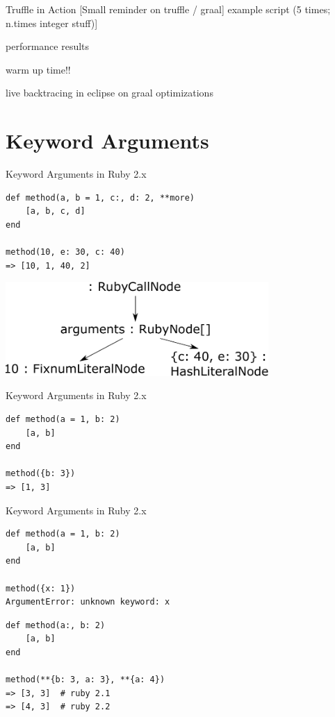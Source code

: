 \documentclass[xcolor=dvipsname,handout]{beamer} %
\begin{document}
\begin{frame}{Truffle in Action}
[Small reminder on truffle / graal]
example script (5 times; n.times integer stuff)]

performance results

warm up time!!

live backtracing in eclipse on graal optimizations
\end{frame}

\section{Keyword Arguments}

\begin{frame}[fragile]{Keyword Arguments in Ruby 2.x}
\begin{lstlisting}
def method(a, b = 1, c:, d: 2, **more)
    [a, b, c, d]
end

method(10, e: 30, c: 40)
=> [10, 1, 40, 2]
\end{lstlisting}

\begin{table}
    \centering
    \includegraphics[width=0.75\textwidth]{kwarg_1.pdf}
\end{table}
\end{frame}

\begin{frame}[fragile]{Keyword Arguments in Ruby 2.x}
\begin{lstlisting}
def method(a = 1, b: 2)
    [a, b]
end

method({b: 3})
=> [1, 3]
\end{lstlisting}
\end{frame}

\begin{frame}[fragile]{Keyword Arguments in Ruby 2.x}
\begin{lstlisting}[caption=test]
def method(a = 1, b: 2)
    [a, b]
end

method({x: 1})
ArgumentError: unknown keyword: x
\end{lstlisting}

\begin{lstlisting}[caption=test]
def method(a:, b: 2)
    [a, b]
end

method(**{b: 3, a: 3}, **{a: 4})
=> [3, 3]  # ruby 2.1
=> [4, 3]  # ruby 2.2
\end{lstlisting}
\end{frame}
\end{document}
